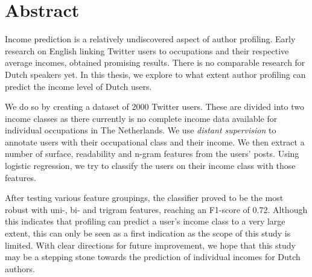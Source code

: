 \documentclass[
10pt, %
a4paper, %
oneside, %
headinclude,footinclude, %
] {book}%
\begin{document}

\chapter*{Abstract}
Income prediction is a relatively undiscovered aspect of author profiling. Early research on English \citep{flekova} linking Twitter users to occupations and their respective average incomes, obtained promising results. There is no comparable research for Dutch speakers yet. In this thesis, we explore to what extent author profiling can predict the income level of Dutch users.

We do so by creating a dataset of 2000 Twitter users. These are divided into two income classes as there currently is no complete income data available for individual occupations in The Netherlands. We use \textit{distant supervision} to annotate users with their occupational class and their income. We then extract a number of surface, readability and n-gram features from the users' posts. Using logistic regression, we try to classify the users on their income class with those features.

After testing various feature groupings, the classifier proved to be the most robust with uni-, bi- and trigram features, reaching an F1-score of 0.72. Although this indicates that profiling can predict a user's income class to a very large extent, this can only be seen as a first indication as the scope of this study is limited. With clear directions for future improvement, we hope that this study may be a stepping stone towards the prediction of individual incomes for Dutch authors.

\clearpage
\setcounter{tocdepth}{3} %
\tableofcontents %


\end{document}
